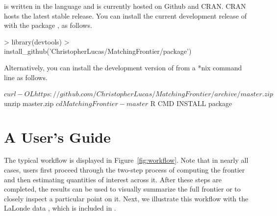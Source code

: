 \documentclass[nojss]{jss}
\begin{document}
 is written in the  language
\citep{r2012} and is currently hosted on Github and CRAN. CRAN hosts
the latest stable release. You can install the current development
release of  with the  package
\citep{wickham2013}, as follows.

\begin{Code}
> library(devtools) 
> install_github('ChristopherLucas/MatchingFrontier/package')
\end{Code} 

Alternatively, you can install the development version of
 from a *nix command line as follows.

\begin{Code}
$ curl -OL https://github.com/ChristopherLucas/MatchingFrontier/archive/master.zip
$ unzip master.zip
$ cd MatchingFrontier-master
$ R CMD INSTALL package
\end{Code} 

\section[A User's Guide]{A User's Guide}

The typical  workflow is displayed in
Figure~\ref{fig:workflow}. Note that in nearly all cases, users first
proceed through the two-step process of computing the frontier and
then estimating quantities of interest across it. After these steps
are completed, the results can be used to visually summarize the full
frontier or to closely inspect a particular point on it.  Next, we
illustrate this workflow with the LaLonde data
\citep{lalonde1986,dehejia1999}, which is included in
.
\end{document}
